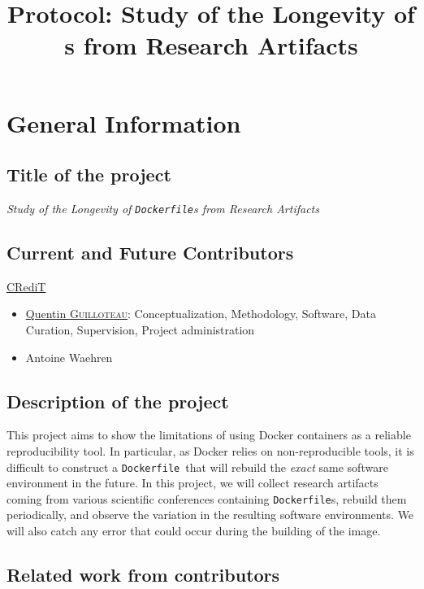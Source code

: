 \documentclass{article}
\title{Protocol: Study of the Longevity of \dfile s from Research Artifacts}
\newcommand{\dfile}{\texttt{Dockerfile}}
\begin{document}
\maketitle

\section{General Information}

\subsection{Title of the project}

\emph{Study of the Longevity of \dfile s from Research Artifacts}

\subsection{Current and Future Contributors}

\href{https://www.elsevier.com/researcher/author/policies-and-guidelines/credit-author-statement}{CRediT}

\begin{itemize}
  \item \href{https://orcid.org/0009-0003-7645-5044}{Quentin \textsc{Guilloteau}}: Conceptualization, Methodology, Software, Data Curation, Supervision, Project administration
  \item Antoine Waehren
\end{itemize}


\subsection{Description of the project}

This project aims to show the limitations of using Docker containers as a reliable reproducibility tool.
In particular, as Docker relies on non-reproducible tools, it is difficult to construct a \dfile\ that will rebuild the \emph{exact} same software environment in the future.
In this project, we will collect research artifacts coming from various scientific conferences containing \dfile s, rebuild them periodically, and observe the variation in the resulting software environments.
We will also catch any error that could occur during the building of the image.

\subsection{Related work from contributors}
\end{document}

